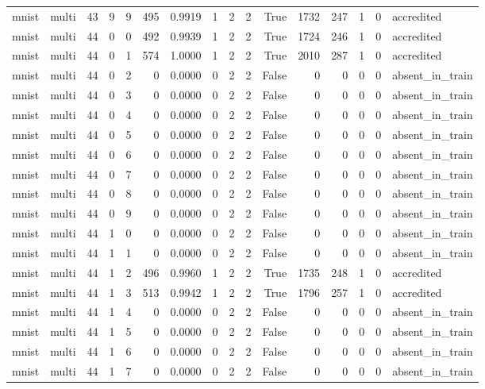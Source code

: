 \begin{tabular}{llrrrrrrrrrrrrrl}
mnist & multi & 43 & 9 & 9 & 495 & 0.9919 & 1 & 2 & 2 & True & 1732 & 247 & 1 & 0 & accredited \\
mnist & multi & 44 & 0 & 0 & 492 & 0.9939 & 1 & 2 & 2 & True & 1724 & 246 & 1 & 0 & accredited \\
mnist & multi & 44 & 0 & 1 & 574 & 1.0000 & 1 & 2 & 2 & True & 2010 & 287 & 1 & 0 & accredited \\
mnist & multi & 44 & 0 & 2 & 0 & 0.0000 & 0 & 2 & 2 & False & 0 & 0 & 0 & 0 & absent\_in\_train \\
mnist & multi & 44 & 0 & 3 & 0 & 0.0000 & 0 & 2 & 2 & False & 0 & 0 & 0 & 0 & absent\_in\_train \\
mnist & multi & 44 & 0 & 4 & 0 & 0.0000 & 0 & 2 & 2 & False & 0 & 0 & 0 & 0 & absent\_in\_train \\
mnist & multi & 44 & 0 & 5 & 0 & 0.0000 & 0 & 2 & 2 & False & 0 & 0 & 0 & 0 & absent\_in\_train \\
mnist & multi & 44 & 0 & 6 & 0 & 0.0000 & 0 & 2 & 2 & False & 0 & 0 & 0 & 0 & absent\_in\_train \\
mnist & multi & 44 & 0 & 7 & 0 & 0.0000 & 0 & 2 & 2 & False & 0 & 0 & 0 & 0 & absent\_in\_train \\
mnist & multi & 44 & 0 & 8 & 0 & 0.0000 & 0 & 2 & 2 & False & 0 & 0 & 0 & 0 & absent\_in\_train \\
mnist & multi & 44 & 0 & 9 & 0 & 0.0000 & 0 & 2 & 2 & False & 0 & 0 & 0 & 0 & absent\_in\_train \\
mnist & multi & 44 & 1 & 0 & 0 & 0.0000 & 0 & 2 & 2 & False & 0 & 0 & 0 & 0 & absent\_in\_train \\
mnist & multi & 44 & 1 & 1 & 0 & 0.0000 & 0 & 2 & 2 & False & 0 & 0 & 0 & 0 & absent\_in\_train \\
mnist & multi & 44 & 1 & 2 & 496 & 0.9960 & 1 & 2 & 2 & True & 1735 & 248 & 1 & 0 & accredited \\
mnist & multi & 44 & 1 & 3 & 513 & 0.9942 & 1 & 2 & 2 & True & 1796 & 257 & 1 & 0 & accredited \\
mnist & multi & 44 & 1 & 4 & 0 & 0.0000 & 0 & 2 & 2 & False & 0 & 0 & 0 & 0 & absent\_in\_train \\
mnist & multi & 44 & 1 & 5 & 0 & 0.0000 & 0 & 2 & 2 & False & 0 & 0 & 0 & 0 & absent\_in\_train \\
mnist & multi & 44 & 1 & 6 & 0 & 0.0000 & 0 & 2 & 2 & False & 0 & 0 & 0 & 0 & absent\_in\_train \\
mnist & multi & 44 & 1 & 7 & 0 & 0.0000 & 0 & 2 & 2 & False & 0 & 0 & 0 & 0 & absent\_in\_train \\

\end{tabular}
